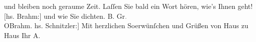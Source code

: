 \begin{ledgroupsized}[t]{13cm}
               und bleiben noch geraume Zeit. Laſſen Sie bald ein Wort hören, wie’s Ihnen geht!
                  {[}hs. Brahm:{]} und wie Sie dichten.\pend
           \pstart
           B. Gr\textcolor{gray}{.}{\\}\spacefill\mbox{OBrahm.}\pend
           \pstart {[}hs. Schnitzler:{]} Mit herzlichen So{\geminationm}erwünſchen und Grüßen von Haus zu Haus Ihr \spacefill\mbox{A.}\pend{}\pstart
           \raggedleft{}\label{T_L03013-1v}\label{T_L03013-1h}\pend
           
         
         \endnumbering{}\end{ledgroupsized}  \newcommand{\dateiname}{L03013}\newcommand{\titel}{Arthur Schnitzler und Otto Brahm an Felix Salten, 19. 7. 1908}\newcommand{\editorInnen}{Martin Anton Müller und Laura Untner}
      